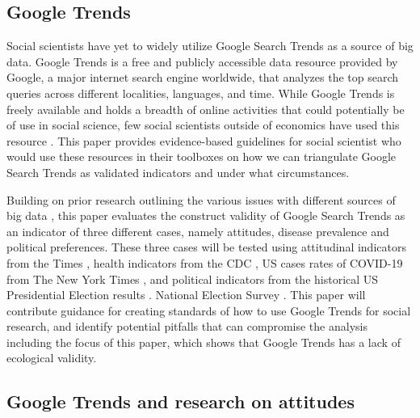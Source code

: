 \subsection{Google Trends}

Social scientists have yet to widely utilize Google Search Trends as a source of
big data. Google Trends is a free and publicly accessible data resource provided
by Google, a major internet search engine worldwide, that analyzes the top
search queries across different localities, languages, and time. While Google
Trends is freely available and holds a breadth of online activities that could
potentially be of use in social science, few social scientists outside of
economics have used this resource \citep[see][for examples]{choi2012predicting,
jun2018ten,da2011search}. This paper provides evidence-based guidelines for
social scientist who would use these resources in their toolboxes on how we can
triangulate Google Search Trends as validated indicators and under what
circumstances.

Building on prior research outlining the various issues with different sources
of big data
\citep{boydCriticalQuestionsBig2012,lazerIssuesConstructValidity2015}, this
paper evaluates the construct validity of Google Search Trends as an indicator
of three different cases, namely attitudes, disease prevalence and political
preferences. These three cases will be tested using attitudinal indicators from
the %
Times \citeyearpar{mask_data}, health indicators from the CDC
\citeyearpar{suic_data}, US cases rates of COVID-19 from The New York Times
\citeyearpar{covid_data}, and political indicators from the historical US
Presidential Election results \citeyearpar{pres_data}. %
National Election Survey \citeyearpar{anes_data}. This paper will contribute
guidance for creating standards of how to use Google Trends for social research,
and identify potential pitfalls that can compromise the analysis including the
focus of this paper, which shows that Google Trends has a lack of ecological
validity.


\subsection{Google Trends and research on attitudes}


